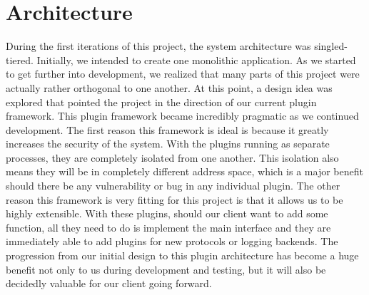 \section{Architecture}
During the first iterations of this project, the system architecture was singled-tiered. Initially, we intended to create one monolithic application. As we started to get further into development, we realized that many parts of this project were actually rather orthogonal to one another. At this point, a design idea was explored that pointed the project in the direction of our current plugin framework. This plugin framework became incredibly pragmatic as we continued development. The first reason this framework is ideal is because it greatly increases the security of the system. With the plugins running as separate processes, they are completely isolated from one another. This isolation also means they will be in completely different address space, which is a major benefit should there be any vulnerability or bug in any individual plugin. The other reason this framework is very fitting for this project is that it allows us to be highly extensible. With these plugins, should our client want to add some function, all they need to do is implement the main interface and they are immediately able to add plugins for new protocols or logging backends. The progression from our initial design to this plugin architecture has become a huge benefit not only to us during development and testing, but it will also be decidedly valuable for our client going forward.
